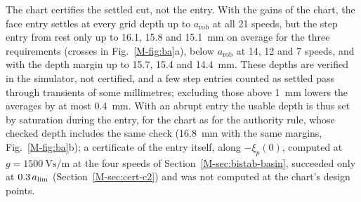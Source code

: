 The chart certifies the settled cut, not the entry. With the gains of the chart, the face entry settles at every grid depth up to $a_{\mathrm{rob}}$ at all 21 speeds, but the step entry from rest only up to 16.1, 15.8 and \SI{15.1}{\milli\metre} on average for the three requirements (crosses in Fig.~\ref{M-fig:ba}a), below $a_{\mathrm{rob}}$ at 14, 12 and 7 speeds, and with the depth margin up to 15.7, 15.4 and \SI{14.4}{\milli\metre}. These depths are verified in the simulator, not certified, and a few step entries counted as settled pass through transients of some millimetres; excluding those above \SI{1}{\milli\metre} lowers the averages by at most \SI{0.4}{\milli\metre}. With an abrupt entry the usable depth is thus set by saturation during the entry, for the chart as for the authority rule, whose checked depth includes the same check (\SI{16.8}{\milli\metre} with the same margins, Fig.~\ref{M-fig:ba}b); a certificate of the entry itself, along $-\xi_p(0)$, computed at $g=\SI{1500}{\volt\second\per\metre}$ at the four speeds of Section~\ref{M-sec:bistab-basin}, succeeded only at $0.3\,a_{\lim}$ (Section~\ref{M-sec:cert-c2}) and was not computed at the chart's design points.

